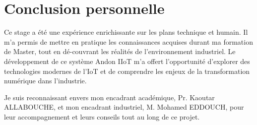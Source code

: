 \section{Conclusion personnelle}

Ce stage a \'et\'e une exp\'erience enrichissante sur les plans technique et humain. Il m'a permis de mettre en pratique les connaissances acquises durant ma formation de Master, tout en d\'e-couvrant les r\'ealit\'es de l'environnement industriel. Le d\'eveloppement de ce syst\`eme Andon IIoT m'a offert l'opportunit\'e d'explorer des technologies modernes de l'IoT et de comprendre les enjeux de la transformation num\'erique dans l'industrie.

Je suis reconnaissant envers mon encadrant acad\'emique, Pr. Kaoutar ALLABOUCHE, et mon encadrant industriel, M. Mohamed EDDOUCH, pour leur accompagnement et leurs conseils tout au long de ce projet.
